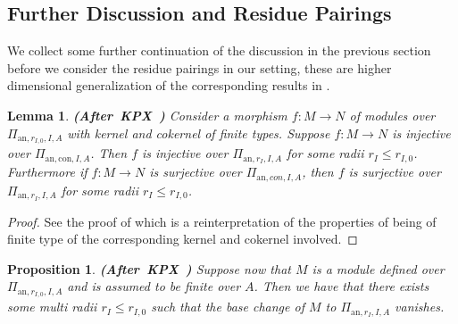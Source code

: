 \documentclass[12pt]{amsart}
\newtheorem{lemma}[theorem]{Lemma}
\newtheorem{proposition}[theorem]{Proposition}
\theoremstyle{definition}
\numberwithin{equation}{section}
\begin{document}
%
%
%






\subsection{Further Discussion and Residue Pairings}


\indent We collect some further continuation of the discussion in the previous section before we consider the residue pairings in our setting, these are higher dimensional generalization of the corresponding results in \cite{KPX}.


\begin{lemma} \mbox{\bf{(After KPX \cite[Lemma 2.1.16]{KPX})}}
Consider a morphism $f:M\rightarrow N$ of modules over $\Pi_{\mathrm{an},r_{I,0},I,A}$ with kernel and cokernel of finite types. Suppose $f:M\rightarrow N$ is injective over $\Pi_{\mathrm{an},\mathrm{con},I,A}$. Then $f$ is injective over $\Pi_{\mathrm{an},r_{I},I,A}$ for some radii $r_I\leq r_{I,0}$. Furthermore if $f:M\rightarrow N$ is surjective over $\Pi_{\mathrm{an},con,I,A}$, then $f$ is surjective over $\Pi_{\mathrm{an},r_{I},I,A}$ for some radii $r_I\leq r_{I,0}$.  	
\end{lemma}


\begin{proof}
See the proof of \cite[Lemma 2.1.16]{KPX} which is a reinterpretation of the properties of being of finite type of the corresponding kernel and cokernel involved.	
\end{proof}



\begin{proposition} \mbox{\bf{(After KPX \cite[Lemma 2.1.18]{KPX})}}
Suppose now that $M$ is a module defined over $\Pi_{\mathrm{an},r_{I,0},I,A}$ and is assumed to be finite over $A$. Then we have that there exists some multi radii $r_I\leq r_{I,0}$ such that the base change of $M$ to $\Pi_{\mathrm{an},r_{I},I,A}$ vanishes. 	
\end{proposition}
\end{document}
